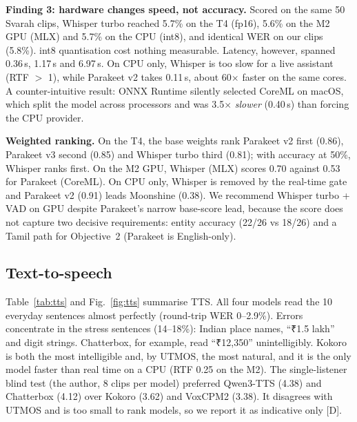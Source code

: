 \documentclass[conference]{IEEEtran}
\newcommand{\rupee}{{\tamilfont ₹}}
\begin{document}
\textbf{Finding 3: hardware changes speed, not accuracy.} Scored on the same 50 Svarah clips, Whisper turbo reached 5.7\% on the T4 (fp16), 5.6\% on the M2 GPU (MLX) and 5.7\% on the CPU (int8), and identical WER on our clips (5.8\%). int8 quantisation cost nothing measurable. Latency, however, spanned 0.36\,s, 1.17\,s and 6.97\,s. On CPU only, Whisper is too slow for a live assistant (RTF $>$ 1), while Parakeet v2 takes 0.11\,s, about 60$\times$ faster on the same cores. A counter-intuitive result: ONNX Runtime silently selected CoreML on macOS, which split the model across processors and was 3.5$\times$ \emph{slower} (0.40\,s) than forcing the CPU provider.

\textbf{Weighted ranking.} On the T4, the base weights rank Parakeet v2 first (0.86), Parakeet v3 second (0.85) and Whisper turbo third (0.81); with accuracy at 50\%, Whisper ranks first. On the M2 GPU, Whisper (MLX) scores 0.70 against 0.53 for Parakeet (CoreML). On CPU only, Whisper is removed by the real-time gate and Parakeet v2 (0.91) leads Moonshine (0.38). We recommend Whisper turbo + VAD on GPU despite Parakeet's narrow base-score lead, because the score does not capture two decisive requirements: entity accuracy (22/26 vs 18/26) and a Tamil path for Objective~2 (Parakeet is English-only).

\subsection{Text-to-speech}
Table~\ref{tab:tts} and Fig.~\ref{fig:tts} summarise TTS. All four models read the 10 everyday sentences almost perfectly (round-trip WER 0--2.9\%). Errors concentrate in the stress sentences (14--18\%): Indian place names, ``\rupee{}1.5 lakh'' and digit strings. Chatterbox, for example, read ``\rupee{}12,350'' unintelligibly. Kokoro is both the most intelligible and, by UTMOS, the most natural, and it is the only model faster than real time on a CPU (RTF 0.25 on the M2). The single-listener blind test (the author, 8 clips per model) preferred Qwen3-TTS (4.38) and Chatterbox (4.12) over Kokoro (3.62) and VoxCPM2 (3.38). It disagrees with UTMOS and is too small to rank models, so we report it as indicative only [D].
\end{document}
